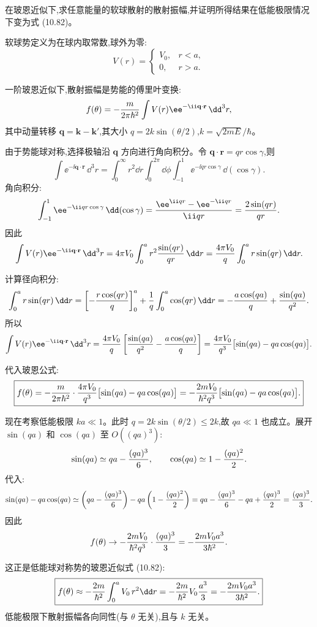 \begin{question}
在玻恩近似下,求任意能量的软球散射的散射振幅,并证明所得结果在低能极限情况下变为式 (10.82)。

\par\smallskip
{}

\begin{solution}
软球势定义为在球内取常数,球外为零:
\[
V(r)=\begin{cases}
V_0,& r<a,\\
0,& r>a.
\end{cases}
\]

一阶玻恩近似下,散射振幅是势能的傅里叶变换:
\[
f(\theta)=-{m\over2\pi\hbar^2}\int V(r)\ee^{-\ii\mathbf q\cdot\mathbf r}\,\dd^3r,
\]
其中动量转移 $\mathbf q=\mathbf k-\mathbf k'$,其大小 $q=2k\sin(\theta/2)$,$k=\sqrt{2mE}/\hbar$。

由于势能球对称,选择极轴沿 $\mathbf q$ 方向进行角向积分。令 $\mathbf q\cdot\mathbf r=qr\cos\gamma$,则
\[
\int \ee^{-\ii\mathbf q\cdot\mathbf r}\,\dd^3r
=\int_0^\infty r^2\dd r\int_0^{2\pi}\dd\phi\int_{-1}^{1}\ee^{-\ii qr\cos\gamma}\,\dd(\cos\gamma).
\]
角向积分:
\[
\int_{-1}^{1}\ee^{-\ii qr\cos\gamma}\,\dd(\cos\gamma)
={\ee^{\ii qr}-\ee^{-\ii qr}\over\ii qr}={2\sin(qr)\over qr}.
\]
因此
\[
\int V(r)\ee^{-\ii\mathbf q\cdot\mathbf r}\,\dd^3r
=4\pi V_0\int_0^a r^2{\sin(qr)\over qr}\,\dd r
={4\pi V_0\over q}\int_0^a r\sin(qr)\,\dd r.
\]

计算径向积分:
\[
\int_0^a r\sin(qr)\,\dd r
=\left[-{r\cos(qr)\over q}\right]_0^a+{1\over q}\int_0^a\cos(qr)\,\dd r
=-{a\cos(qa)\over q}+{\sin(qa)\over q^2}.
\]
所以
\[
\int V(r)\ee^{-\ii\mathbf q\cdot\mathbf r}\,\dd^3r
={4\pi V_0\over q}\left[{\sin(qa)\over q^2}-{a\cos(qa)\over q}\right]
={4\pi V_0\over q^3}\bigl[\sin(qa)-qa\cos(qa)\bigr].
\]

代入玻恩公式:
\[
\boxed{f(\theta)=-{m\over2\pi\hbar^2}\cdot{4\pi V_0\over q^3}\bigl[\sin(qa)-qa\cos(qa)\bigr]
=-{2mV_0\over\hbar^2q^3}\bigl[\sin(qa)-qa\cos(qa)\bigr].}
\]

现在考察低能极限 $ka\ll1$。此时 $q=2k\sin(\theta/2)\le2k$,故 $qa\ll1$ 也成立。展开 $\sin(qa)$ 和 $\cos(qa)$ 至 $O((qa)^3)$:
\[
\sin(qa)\simeq qa-{(qa)^3\over6},\qquad
\cos(qa)\simeq1-{(qa)^2\over2}.
\]
代入:
\[
\sin(qa)-qa\cos(qa)
\simeq\left(qa-{(qa)^3\over6}\right)-qa\left(1-{(qa)^2\over2}\right)
=qa-{(qa)^3\over6}-qa+{(qa)^3\over2}
={(qa)^3\over3}.
\]
因此
\[
f(\theta)\to-{2mV_0\over\hbar^2q^3}\cdot{(qa)^3\over3}
=-{2mV_0a^3\over3\hbar^2}.
\]

这正是低能球对称势的玻恩近似式 (10.82):
\[
\boxed{f(\theta)\approx-{2m\over\hbar^2}\int_0^a V_0\,r^2\dd r
=-{2m\over\hbar^2}V_0{a^3\over3}
=-{2mV_0a^3\over3\hbar^2}.}
\]
低能极限下散射振幅各向同性(与 $\theta$ 无关),且与 $k$ 无关。
\end{solution}
\end{question}

